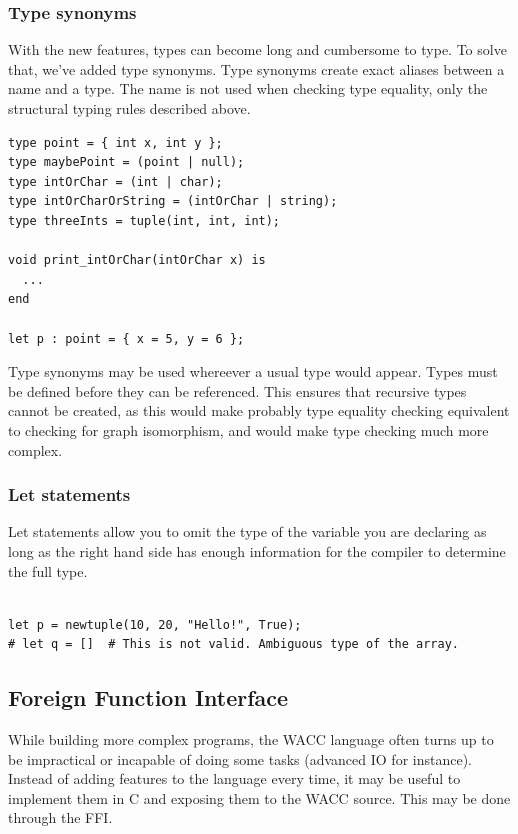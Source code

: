 \documentclass{article}
\begin{document}
\subsubsection{Type synonyms}
With the new features, types can become long and cumbersome to type. To solve that, we've added type synonyms. Type synonyms
create exact aliases between a name and a type. The name is not used when checking type equality, only the structural typing
rules described above. 

\begin{lstlisting}
type point = { int x, int y };
type maybePoint = (point | null);
type intOrChar = (int | char);
type intOrCharOrString = (intOrChar | string);
type threeInts = tuple(int, int, int);

void print_intOrChar(intOrChar x) is
  ...
end

let p : point = { x = 5, y = 6 };

\end{lstlisting}


Type synonyms may be used whereever a usual type would appear.
Types must be defined before they can be referenced. This ensures that recursive types cannot be created, as this would make
probably type equality checking equivalent to checking for graph isomorphism, and would make type checking much more complex.

\subsubsection{Let statements}
Let statements allow you to omit the type of the variable you are declaring as long as the right hand side has enough information for the compiler to determine the full type.
\begin{lstlisting}

let p = newtuple(10, 20, "Hello!", True);
# let q = []  # This is not valid. Ambiguous type of the array.
\end{lstlisting}


\subsection{Foreign Function Interface}
While building more complex programs, the WACC language often turns up to be impractical or incapable of doing some tasks
(advanced IO for instance). Instead of adding features to the language every time, it may be useful to implement them in C
and exposing them to the WACC source. This may be done through the FFI.
\end{document}
